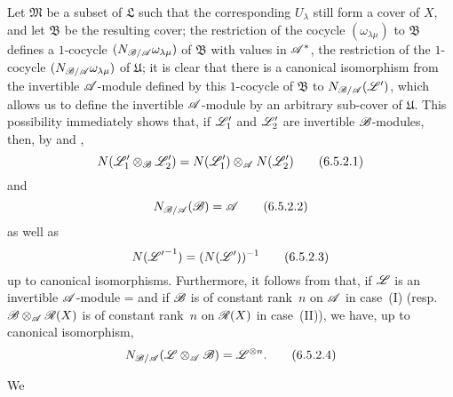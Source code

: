 \begin{env}[6.5.2]
Let $\mathfrak{M}$ be a subset of $\mathfrak{L}$ such that the corresponding $U_\lambda$ still form a cover of $X$, and let $\mathfrak{B}$ be the resulting cover;
the restriction of the cocycle $(\omega_{\lambda\mu})$ to $\mathfrak{B}$ defines a $1$-cocycle $(N_{\mathscr{B}/\mathscr{A}}\omega_{\lambda\mu})$ of $\mathfrak{B}$ with values in $\mathscr{A}^*$, the restriction of the $1$-cocycle $(N_{\mathscr{B}/\mathscr{A}}\omega_{\lambda\mu})$ of $\mathfrak{U}$;
it is clear that there is a canonical isomorphism from the invertible $\mathscr{A}$-module defined by this $1$-cocycle of $\mathfrak{B}$ to $N_{\mathscr{B}/\mathscr{A}}(\mathscr{L}')$, which allows us to define the invertible $\mathscr{A}$-module by an arbitrary sub-cover of $\mathfrak{U}$.
This possibility immediately shows that, if $\mathscr{L}'_1$ and $\mathscr{L}'_2$ are invertible $\mathscr{B}$-modules, then, by  and ,
\[
\label{II.6.5.2.1}
  N(\mathscr{L}'_1\otimes_{\mathscr{B}}\mathscr{L}'_2) = N(\mathscr{L}'_1)\otimes_{\mathscr{A}}N(\mathscr{L}'_2)
\tag{6.5.2.1}
\]
and
\[
\label{II.6.5.2.2}
  N_{\mathscr{B}/\mathscr{A}}(\mathscr{B}) = \mathscr{A}
\tag{6.5.2.2}
\]
as well as
\[
\label{II.6.5.2.3}
  N({\mathscr{L}'}^{-1}) = (N(\mathscr{L}'))^{-1}
\tag{6.5.2.3}
\]
up to canonical isomorphisms.
Furthermore, it follows from  that, if $\mathscr{L}$ is an invertible $\mathscr{A}$-module = and if $\mathscr{B}$ is of constant rank~$n$ on $\mathscr{A}$ in case~(I) (resp. $\mathscr{B}\otimes_{\mathscr{A}}\mathscr{R}(X)$ is of constant rank~$n$ on $\mathscr{R}(X)$ in case~(II)), we have, up to canonical isomorphism,
\[
\label{II.6.5.2.4}
  N_{\mathscr{B}/\mathscr{A}}(\mathscr{L}\otimes_{\mathscr{A}}\mathscr{B}) = \mathscr{L}^{\otimes n}.
\tag{6.5.2.4}
\]
\end{env}

\begin{env}[6.5.3]
\label{II.6.5.3}
We
\end{env}




